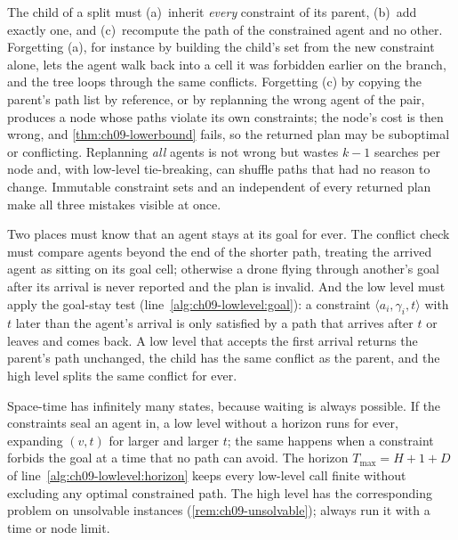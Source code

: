 \begin{pitfall}
The child of a split must (a)~inherit \emph{every} constraint of its parent,
(b)~add exactly one, and (c)~recompute the path of the constrained agent and
no other. Forgetting (a), for instance by building the child's set from the
new constraint alone, lets the agent walk back into a cell it was forbidden
earlier on the branch, and the tree loops through the same conflicts.
Forgetting (c) by copying the parent's path list by reference, or by
replanning the wrong agent of the pair, produces a node whose paths violate
its own constraints; the node's cost is then wrong, and \cref{thm:ch09-lowerbound}
fails, so the returned plan may be suboptimal or conflicting. Replanning
\emph{all} agents is not wrong but wastes $k-1$ searches per node and, with
low-level tie-breaking, can shuffle paths that had no reason to change.
Immutable constraint sets and an independent  of every
returned plan make all three mistakes visible at once.
\end{pitfall}

\begin{pitfall}
Two places must know that an agent stays at its goal for ever. The conflict
check must compare agents beyond the end of the shorter path, treating the
arrived agent as sitting on its goal cell; otherwise a drone flying through
another's goal after its arrival is never reported and the plan is invalid.
And the low level must apply the goal-stay test
(line~\ref{alg:ch09-lowlevel:goal}): a constraint $\langle a_i, \gamma_i, t\rangle$
with $t$ later than the agent's arrival is only satisfied by a path that
arrives after $t$ or leaves and comes back. A low level that accepts the
first arrival returns the parent's path unchanged, the child has the same
conflict as the parent, and the high level splits the same conflict for
ever.
\end{pitfall}

\begin{pitfall}
Space-time has infinitely many states, because waiting is always possible.
If the constraints seal an agent in, a low level without a horizon runs for
ever, expanding $(v, t)$ for larger and larger $t$; the same happens when a
constraint forbids the goal at a time that no path can avoid. The horizon
$T_{\max} = H + 1 + D$ of line~\ref{alg:ch09-lowlevel:horizon} keeps every
low-level call finite without excluding any optimal constrained path. The
high level has the corresponding problem on unsolvable instances
(\cref{rem:ch09-unsolvable}); always run it with a time or node limit.
\end{pitfall}

